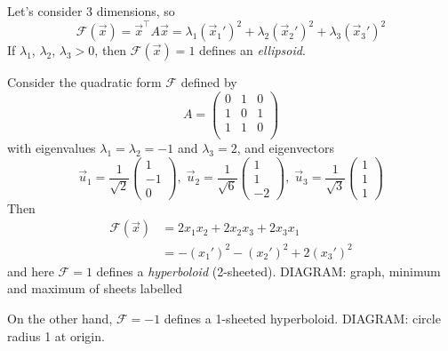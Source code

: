 \documentclass{../template/note}
\begin{document}

    Let's consider 3 dimensions, so
    \[
        \mathcal F(\vec x) = \vec x^\intercal A \vec x = \lambda_1(\vec x_1')^2 + \lambda_2(\vec x_2')^2 + \lambda_3(\vec x_3')^2
    \]
    If \(\lambda_1\), \(\lambda_2\), \(\lambda_3 > 0\), then \(\mathcal F(\vec x) = 1\) defines an \emph{ellipsoid}.

    \begin{example}
        Consider the quadratic form \(\mathcal F\) defined by
        \[
            A = \begin{pmatrix}
             0 & 1 & 0 \\
             1 & 0 & 1 \\
             1 & 1 & 0 \\
            \end{pmatrix}
        \]
        with eigenvalues \(\lambda_1 = \lambda_2 = -1\) and \(\lambda_3 = 2\), and eigenvectors 
        \[
            \vec u_1 = \frac{1}{\sqrt 2} \begin{pmatrix}
                1 \\
                -1 \\
                0
            \end{pmatrix}, \; \vec u_2 = \frac{1}{\sqrt 6} \begin{pmatrix}
                1 \\
                1 \\
                -2
            \end{pmatrix}, \; \vec u_3 = \frac{1}{\sqrt 3} \begin{pmatrix}
                1 \\
                1 \\
                1
            \end{pmatrix}
        \]
        Then
        \begin{align*}
            \mathcal F(\vec x) &= 2x_1x_2 + 2x_2x_3 + 2x_3x_1 \\
            &= -(x_1')^2 - (x_2')^2 + 2(x_3')^2
        \end{align*}
        and here \(\mathcal F = 1\) defines a \emph{hyperboloid} (2-sheeted).
        DIAGRAM: graph, minimum and maximum of sheets labelled

        On the other hand, \(\mathcal F = -1\) defines a 1-sheeted hyperboloid.
        DIAGRAM: circle radius 1 at origin.
    \end{example}
    
\end{document}
